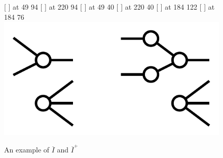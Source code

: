 \documentclass{amsart}
\numberwithin{theorem}{subsection}
\theoremstyle{definition}
\newcommand{\bbone}{\mathbbb{1}}
\newcommand{\olI}{\overline{I}}
\begin{document}
\begin{figure}[htb]
\small\hair 2pt
  [ ] at 49 94
  [ ] at 220 94
  [ ] at 49 40
  [ ] at 220 40
 \pinlabel {$\bbone$} [ ] at 184 122
 \pinlabel {$\bbone$} [ ] at 184 76
\endlabellist
\centering
\includegraphics[scale=0.8]{I_Iplus}
\caption{An example of $\olI$ and $\olI^+$}
\label{figure example I I plus bar}
\end{figure}
\end{document}
